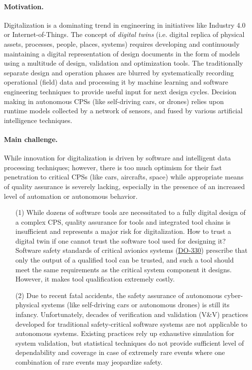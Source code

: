 \paragraph{Motivation.} 
Digitalization is a dominating trend in engineering in initiatives like Industry 4.0 or Internet-of-Things. The concept of \emph{digital twins} (i.e. digital replica of physical assets, processes, people, places, systems) requires developing and continuously maintaining a digital representation of design documents in the form of models using a multitude of design, validation and optimization tools. The traditionally separate design and operation phases are blurred by systematically recording operational (field) data and processing it by machine learning and software engineering techniques to provide useful input for next design cycles. Decision making in autonomous CPSs (like self-driving cars, or drones) relies upon runtime models collected by a network of sensors, and fused by various artificial intelligence techniques. 

\paragraph{Main challenge.}
While innovation for digitalization is driven by software and intelligent data processing techniques; however, there is too much optimism for their fast penetration to critical CPSs (like cars, aircrafts, space) while appropriate means of quality assurance is severely lacking, especially in the presence of an increased level of automation or autonomous behavior.
 
\begin{itemize}
\item[(1)] 
While dozens of software tools are necessitated to a fully digital design of a complex CPS, quality assurance for tools and integrated tool chains is insufficient and represents a major risk for digitalization. How to trust a digital twin if one cannot trust the software tool used for designing it? Software safety standards of critical avionics systems (\href{https://standards.globalspec.com/std/1461615/rtca-do-330}{DO-330}) prescribe that only the output of a qualified tool can be trusted, and such a tool should meet the same requirements as the critical system component it designs. However, it makes tool qualification extremely costly.

\item[(2)]
Due to recent fatal accidents, the safety assurance of autonomous cyber-physical systems (like self-driving cars or autonomous drones) is still its infancy. Unfortunately, decades of verification and validation (V\&V) practices developed for traditional safety-critical software systems are not applicable to autonomous systems. Existing practices rely up exhaustive simulation for system validation, but statistical techniques do not provide sufficient level of dependability and coverage in case of extremely rare events where one combination of rare events may jeopardize safety.
\end{itemize}

